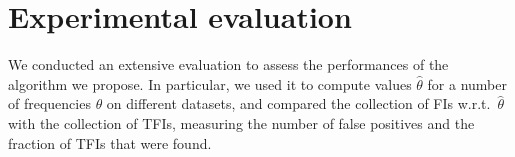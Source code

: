 \section{Experimental evaluation}\label{sec:experiments}
We conducted an extensive evaluation to assess the performances of the algorithm
we propose. In particular, we used it %
to compute values $\hat\theta$
for a number of frequencies $\theta$ on different datasets, and compared the
collection of FIs w.r.t.~$\hat\theta$ with the collection of TFIs, measuring
the number of false positives %
and the fraction of TFIs that were found.


